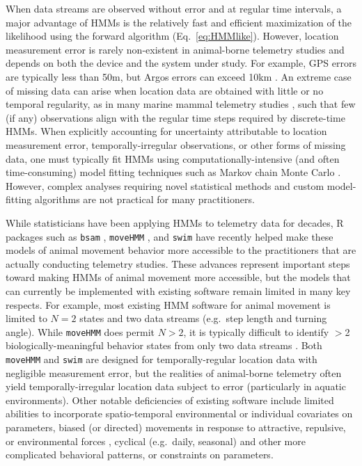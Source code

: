 \documentclass[12pt]{article}\usepackage[]{graphicx}\usepackage[]{color}
\begin{document}
When data streams are observed without error and at regular time intervals, a major advantage of HMMs is the relatively fast and efficient maximization of the likelihood using the forward algorithm (Eq.\ \ref{eq:HMMlike}).  However, location measurement error is rarely non-existent in animal-borne telemetry studies and depends on both the device and the system under study.  For example, GPS errors are typically less than 50m, but Argos errors can exceed 10km \citep[e.g.][]{CostaEtAl2010}.  An extreme case of missing data can arise when location data are obtained with little or no temporal regularity, as in many marine mammal telemetry studies \citep[e.g.][]{JonsenEtAl2005}, such that few (if any) observations align with the regular time steps required by discrete-time HMMs. When explicitly accounting for uncertainty attributable to location measurement error, temporally-irregular observations, or other forms of missing data, one must typically fit HMMs using computationally-intensive (and often time-consuming) model fitting techniques such as Markov chain Monte Carlo \citep{JonsenEtAl2005,McClintockEtAl2012}.  However, complex analyses requiring novel statistical methods and custom model-fitting algorithms are not practical for many practitioners.

While statisticians have been applying HMMs to telemetry data for decades, R \citep{RCoreTeam2017} packages such as \verb|bsam| \citep{JonsenEtAl2005}, \verb|moveHMM| \citep{MichelotEtAl2016}, and \verb|swim| \citep{WhoriskeyEtAl2017} have recently helped make these models of animal movement behavior more accessible to the practitioners that are actually conducting telemetry studies.  These advances represent important steps toward making HMMs of animal movement more accessible, but the models that can currently be implemented with existing software remain limited in many key respects. For example, most existing HMM software for animal movement is limited to $N=2$ states and two data streams (e.g.\ step length and turning angle). While \verb|moveHMM| does permit $N>2$, it is typically difficult to identify $>$2 biologically-meaningful behavior states from only two data streams \citep[e.g.][]{MoralesEtAl2004,BeyerEtAl2013,McClintockEtAl2014b}. Both \verb|moveHMM| and \verb|swim| are designed for temporally-regular location data with negligible measurement error, but the realities of animal-borne telemetry often yield temporally-irregular location data subject to error (particularly in aquatic environments). Other notable deficiencies of existing software include limited abilities to incorporate spatio-temporal environmental or individual covariates on parameters, biased (or directed) movements in response to attractive, repulsive, or environmental forces \citep[e.g.][]{McClintockEtAl2012,LangrockEtAl2014}, cyclical (e.g.\ daily, seasonal) and other more complicated behavioral patterns, or constraints on parameters. %
\end{document}
